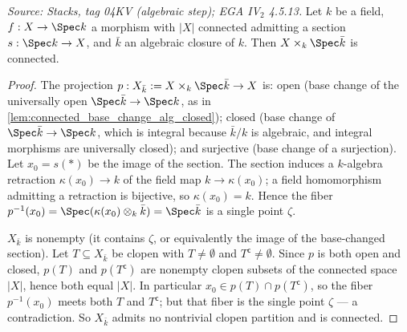 \begin{lemma}

  \label{lem:connected_base_change_algebraic_closure}
  \textit{Source: Stacks, tag 04KV (algebraic step); EGA IV\(_2\) 4.5.13.}
  Let \(k\) be a field, \(f : X \to \Spec k\) a morphism with \(|X|\)
  connected admitting a section \(s : \Spec k \to X\), and
  \(\bar k\) an algebraic closure of \(k\). Then
  \(X \times_k \Spec \bar k\) is connected.
\end{lemma}
\begin{proof}
  \leanok
  The projection \(p : X_{\bar k} := X \times_k \Spec \bar k \to X\) is:
  open (base change of the universally open \(\Spec \bar k \to \Spec
  k\), as in \cref{lem:connected_base_change_alg_closed}); closed
  (base change of \(\Spec \bar k \to \Spec k\), which is integral
  because \(\bar k / k\) is algebraic, and integral morphisms are
  universally closed); and surjective (base change of a surjection).
  Let \(x_0 = s(\ast)\) be the image of the section. The section
  induces a \(k\)-algebra retraction \(\kappa(x_0) \to k\) of the field
  map \(k \to \kappa(x_0)\); a field homomorphism admitting a
  retraction is bijective, so \(\kappa(x_0) = k\). Hence the fiber
  \(p^{-1}(x_0) = \Spec(\kappa(x_0) \otimes_k \bar k) = \Spec \bar k\)
  is a single point \(\zeta\).

  \(X_{\bar k}\) is nonempty (it contains \(\zeta\), or equivalently
  the image of the base-changed section). Let \(T \subseteq
  X_{\bar k}\) be clopen with \(T \neq \emptyset\) and
  \(T^{\mathsf c} \neq \emptyset\). Since \(p\) is both open and
  closed, \(p(T)\) and \(p(T^{\mathsf c})\) are nonempty clopen subsets
  of the connected space \(|X|\), hence both equal \(|X|\). In
  particular \(x_0 \in p(T) \cap p(T^{\mathsf c})\), so the fiber
  \(p^{-1}(x_0)\) meets both \(T\) and \(T^{\mathsf c}\); but that
  fiber is the single point \(\zeta\) — a contradiction. So
  \(X_{\bar k}\) admits no nontrivial clopen partition and is
  connected.
\end{proof}

